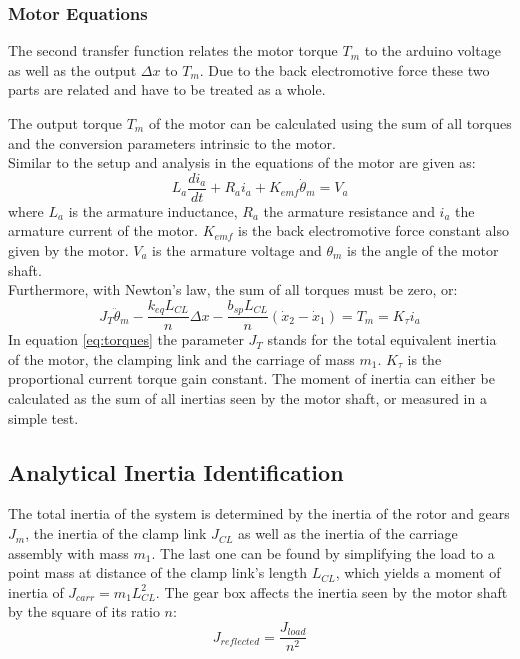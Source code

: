 	\subsubsection{Motor Equations}
	The second transfer function relates the motor torque $T_m$ to the arduino voltage as well as the output $\Delta x$ to $T_m$. Due to the back electromotive force these two parts are related and have to be treated as a whole.
	
	The output torque $T_m$ of the motor can be calculated using the sum of all torques and the conversion parameters intrinsic to the motor.\\
	Similar to the setup and analysis in \cite{Junior2016} the equations of the motor are given as:
	\begin{equation}
		L_a \frac{di_a}{dt} + R_a i_a + K_{emf} \dot{\theta }_m = V_a
	\end{equation}
	where $L_a$ is the armature inductance, $R_a$ the armature resistance and $i_a$ the armature current of the motor. $K_{emf}$ is the back electromotive force constant also given by the motor. $V_a$ is the armature voltage and $\theta_m$ is the angle of the motor shaft.\\
	Furthermore, with Newton's law, the sum of all torques must be zero, or:
	\begin{equation}
		J_{T} \ddot{\theta }_m - \frac{k_{eq} L_{CL}}{n} \Delta x - \frac{b_{sp} L_{CL}}{n} (\dot{x}_2 - \dot{x}_1)  = T_m = K_{\tau} i_a
		\label{eq:torques}
	\end{equation}
	In equation \ref{eq:torques} the parameter $J_{T}$ stands for the total equivalent inertia of the motor, the clamping link and the carriage of mass $m_1$.  $K_{\tau}$ is the proportional current torque gain constant. The moment of inertia can either be calculated as the sum of all inertias seen by the motor shaft, or measured in a simple test.\\ 
	
	\subsection{Analytical Inertia Identification}
	The total inertia of the system is determined by the inertia of the rotor and gears $J_m$, the inertia of the clamp link $J_{CL}$ as well as the inertia of the carriage assembly with mass $m_1$. The last one can be found by simplifying the load to a point mass at distance of the clamp link's length $L_{CL}$, which yields a moment of inertia of $J_{carr} = m_1 L_{CL}^2$.
	The gear box affects the inertia seen by the motor shaft by the square of its ratio $n$:
	\begin{equation}
		J_{reflected} = \frac{ J_{load}}{n^2}
	\end{equation}

